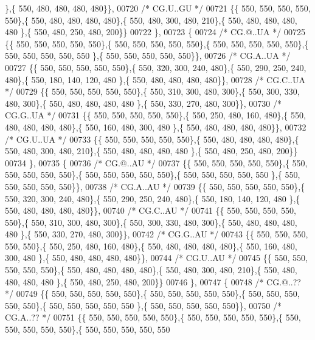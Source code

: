 \begin{DoxyCode}
      \},\{ 550, 480, 480, 480, 480\}\},
00720 \textcolor{comment}{/* CG.U..GU */}
00721 \{\{ 550, 550, 550, 550, 550\},\{ 550, 480, 480, 480, 480\},\{ 550, 480, 300, 480, 210\},\{ 550, 480, 480, 480, 480
      \},\{ 550, 480, 250, 480, 200\}\}
00722 \},
00723 \{
00724 \textcolor{comment}{/* CG.@..UA */}
00725 \{\{ 550, 550, 550, 550, 550\},\{ 550, 550, 550, 550, 550\},\{ 550, 550, 550, 550, 550\},\{ 550, 550, 550, 550, 550
      \},\{ 550, 550, 550, 550, 550\}\},
00726 \textcolor{comment}{/* CG.A..UA */}
00727 \{\{ 550, 550, 550, 550, 550\},\{ 550, 320, 300, 240, 480\},\{ 550, 290, 250, 240, 480\},\{ 550, 180, 140, 120, 480
      \},\{ 550, 480, 480, 480, 480\}\},
00728 \textcolor{comment}{/* CG.C..UA */}
00729 \{\{ 550, 550, 550, 550, 550\},\{ 550, 310, 300, 480, 300\},\{ 550, 300, 330, 480, 300\},\{ 550, 480, 480, 480, 480
      \},\{ 550, 330, 270, 480, 300\}\},
00730 \textcolor{comment}{/* CG.G..UA */}
00731 \{\{ 550, 550, 550, 550, 550\},\{ 550, 250, 480, 160, 480\},\{ 550, 480, 480, 480, 480\},\{ 550, 160, 480, 300, 480
      \},\{ 550, 480, 480, 480, 480\}\},
00732 \textcolor{comment}{/* CG.U..UA */}
00733 \{\{ 550, 550, 550, 550, 550\},\{ 550, 480, 480, 480, 480\},\{ 550, 480, 300, 480, 210\},\{ 550, 480, 480, 480, 480
      \},\{ 550, 480, 250, 480, 200\}\}
00734 \},
00735 \{
00736 \textcolor{comment}{/* CG.@..AU */}
00737 \{\{ 550, 550, 550, 550, 550\},\{ 550, 550, 550, 550, 550\},\{ 550, 550, 550, 550, 550\},\{ 550, 550, 550, 550, 550
      \},\{ 550, 550, 550, 550, 550\}\},
00738 \textcolor{comment}{/* CG.A..AU */}
00739 \{\{ 550, 550, 550, 550, 550\},\{ 550, 320, 300, 240, 480\},\{ 550, 290, 250, 240, 480\},\{ 550, 180, 140, 120, 480
      \},\{ 550, 480, 480, 480, 480\}\},
00740 \textcolor{comment}{/* CG.C..AU */}
00741 \{\{ 550, 550, 550, 550, 550\},\{ 550, 310, 300, 480, 300\},\{ 550, 300, 330, 480, 300\},\{ 550, 480, 480, 480, 480
      \},\{ 550, 330, 270, 480, 300\}\},
00742 \textcolor{comment}{/* CG.G..AU */}
00743 \{\{ 550, 550, 550, 550, 550\},\{ 550, 250, 480, 160, 480\},\{ 550, 480, 480, 480, 480\},\{ 550, 160, 480, 300, 480
      \},\{ 550, 480, 480, 480, 480\}\},
00744 \textcolor{comment}{/* CG.U..AU */}
00745 \{\{ 550, 550, 550, 550, 550\},\{ 550, 480, 480, 480, 480\},\{ 550, 480, 300, 480, 210\},\{ 550, 480, 480, 480, 480
      \},\{ 550, 480, 250, 480, 200\}\}
00746 \},
00747 \{
00748 \textcolor{comment}{/* CG.@..?? */}
00749 \{\{ 550, 550, 550, 550, 550\},\{ 550, 550, 550, 550, 550\},\{ 550, 550, 550, 550, 550\},\{ 550, 550, 550, 550, 550
      \},\{ 550, 550, 550, 550, 550\}\},
00750 \textcolor{comment}{/* CG.A..?? */}
00751 \{\{ 550, 550, 550, 550, 550\},\{ 550, 550, 550, 550, 550\},\{ 550, 550, 550, 550, 550\},\{ 550, 550, 550, 550, 550

\end{DoxyCode}
